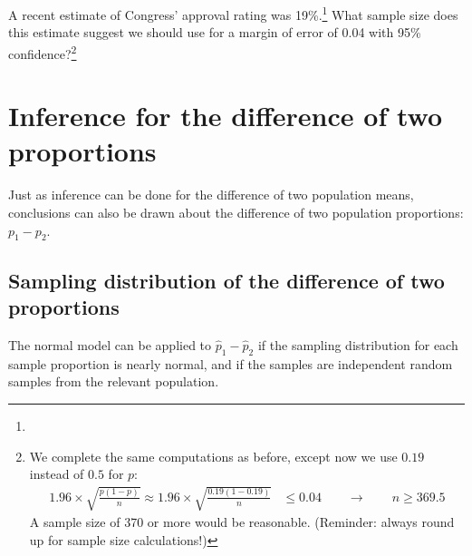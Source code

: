 
\begin{exercise}
A recent estimate of Congress' approval rating was 19\%.\footnote{} What sample size does this estimate suggest we should use for a margin of error of 0.04 with 95\% confidence?\footnote{We complete the same computations as before, except now we use $0.19$ instead of $0.5$ for $p$:
\begin{align*}
1.96\times \sqrt{\frac{p(1-p)}{n}} \approx
1.96\times \sqrt{\frac{0.19(1-0.19)}{n}} &\leq 0.04 \qquad\to\qquad n \geq 369.5
\end{align*}
A sample size of 370 or more would be reasonable. (Reminder: always round up for sample size calculations!)}


\end{exercise}



\section{Inference for the difference of two proportions}
\label{differenceOfTwoProportions}

Just as inference can be done for the difference of two population means, conclusions can also be drawn about the difference of two population proportions: $p_1 - p_2$. 

\subsection{Sampling distribution of the difference of two proportions}

The normal model can be applied to $\hat{p}_1 - \hat{p}_2$ if the sampling distribution for each sample proportion is nearly normal, and if the samples are independent random samples from the relevant population. 

